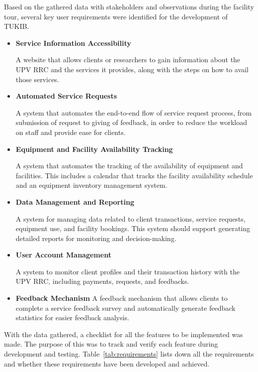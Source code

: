 Based on the gathered data with stakeholders and observations during the facility tour, several key user requirements were identified for the development of TUKIB. 

\begin{itemize}
	\item \textbf{Service Information Accessibility}
	
	A website that allows clients or researchers to gain information about the UPV RRC and the services it provides, along with the steps on how to avail those services. 
	
	\item \textbf{Automated Service Requests}
	
	A system that automates the end-to-end flow of service request process, from submission of request to giving of feedback, in order to reduce the workload on staff and provide ease for clients.
	
	\item \textbf{Equipment and Facility Availability Tracking}
	
	A system that automates the tracking of the availability of equipment and facilities. This includes a calendar that tracks the facility availability schedule and an equipment inventory management system. 
	
	\item \textbf{Data Management and Reporting}
	
	A system for managing data related to client transactions, service requests, equipment use, and facility bookings. This system should support generating detailed reports for monitoring and decision-making.
	
	\item \textbf{User Account Management}
	
	A system to monitor client profiles and their transaction history with the UPV RRC, including payments, requests, and feedbacks.
	
	\item \textbf{Feedback Mechanism}
	A feedback mechanism that allows clients to complete a service feedback survey and automatically generate feedback statistics for easier feedback analysis.
	
\end{itemize}

With the data gathered, a checklist for all the features to be implemented was made. The purpose of this was to track and verify each feature during development and testing. Table~\ref{tab:requirements} lists down all the requirements and whether these requirements have been developed and achieved.

